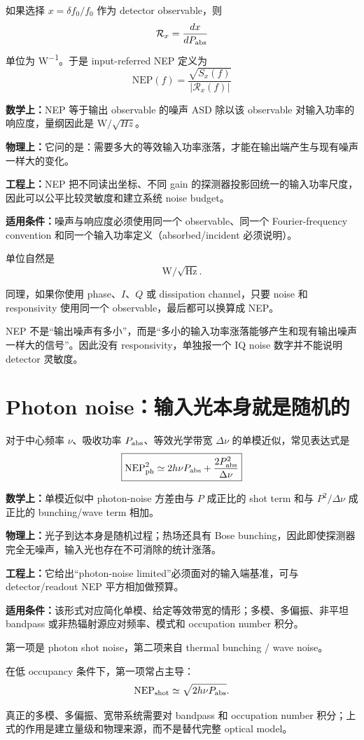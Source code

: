 \documentclass[11pt,a4paper,openany]{ctexrep}
\newcommand{\formulaexplain}[4]{%
\begin{formulaguidebox}
\textbf{\color{KidBlue}数学上：}#1\par
\textbf{\color{KidTeal}物理上：}#2\par
\textbf{\color{KidGold!55!black}工程上：}#3\par
\textbf{\color{KidRed}适用条件：}#4
\end{formulaguidebox}%
}
\begin{document}
如果选择 $x=\delta f_0/f_0$ 作为 detector observable，则
\[
\mathcal R_x=\frac{dx}{dP_{\rm abs}}
\]
单位为 \si{W^{-1}}。于是 input-referred NEP 定义为
\[
\boxed{
\mathrm{NEP}(f)
=
\frac{\sqrt{S_x(f)}}{|\mathcal R_x(f)|}
}
\]
\formulaexplain
{NEP 等于输出 observable 的噪声 ASD 除以该 observable 对输入功率的响应度，量纲因此是 $\mathrm{W}/\sqrt{Hz}$。}
{它问的是：需要多大的等效输入功率涨落，才能在输出端产生与现有噪声一样大的变化。}
{NEP 把不同读出坐标、不同 gain 的探测器投影回统一的输入功率尺度，因此可以公平比较灵敏度和建立系统 noise budget。}
{噪声与响应度必须使用同一个 observable、同一个 Fourier-frequency convention 和同一个输入功率定义（absorbed/incident 必须说明）。}
单位自然是
\[
\boxed{\mathrm{W}/\sqrt{\mathrm{Hz}}}.
\]

同理，如果你使用 phase、$I$、$Q$ 或 dissipation channel，只要 noise 和 responsivity 使用同一个 observable，最后都可以换算成 NEP。

\begin{intuitionbox}
NEP 不是“输出噪声有多小”，而是“多小的输入功率涨落能够产生和现有输出噪声一样大的信号”。因此没有 responsivity，单独报一个 IQ noise 数字并不能说明 detector 灵敏度。
\end{intuitionbox}

\section{Photon noise：输入光本身就是随机的}

对于中心频率 $\nu$、吸收功率 $P_{\rm abs}$、等效光学带宽 $\Delta\nu$ 的单模近似，常见表达式是
\[
\boxed{
\mathrm{NEP}_{\rm ph}^2
\simeq
2h\nu P_{\rm abs}
+
\frac{2P_{\rm abs}^2}{\Delta\nu}
}
\]
\formulaexplain
{单模近似中 photon-noise 方差由与 $P$ 成正比的 shot term 和与 $P^2/\Delta\nu$ 成正比的 bunching/wave term 相加。}
{光子到达本身是随机过程；热场还具有 Bose bunching，因此即使探测器完全无噪声，输入光也存在不可消除的统计涨落。}
{它给出“photon-noise limited”必须面对的输入端基准，可与 detector/readout NEP 平方相加做预算。}
{该形式对应简化单模、给定等效带宽的情形；多模、多偏振、非平坦 bandpass 或非热辐射源应对频率、模式和 occupation number 积分。}
第一项是 photon shot noise，第二项来自 thermal bunching / wave noise。

在低 occupancy 条件下，第一项常占主导：
\[
\mathrm{NEP}_{\rm shot}
\simeq
\sqrt{2h\nu P_{\rm abs}}.
\]

真正的多模、多偏振、宽带系统需要对 bandpass 和 occupation number 积分；上式的作用是建立量级和物理来源，而不是替代完整 optical model。
\end{document}
